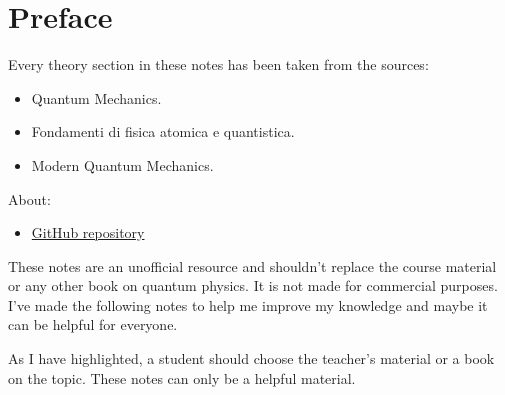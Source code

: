 \section*{Preface}

Every theory section in these notes has been taken from the sources:
\begin{itemize}
    \item Quantum Mechanics.\cite{berera2021quantum}
    \item Fondamenti di fisica atomica e quantistica.\cite{ciccacci2020fondamenti}
    \item Modern Quantum Mechanics.\cite{sakurai2020modern}
\end{itemize}
About:
\begin{itemize}
    \item[\faIcon{github}] \href{https://github.com/PoliMI-HPC-E-notes-projects-AndreVale69/HPC-E-PoliMI-university-notes}{GitHub repository}
\end{itemize}
These notes are an unofficial resource and shouldn't replace the course material or any other book on quantum physics. It is not made for commercial purposes. I've made the following notes to help me improve my knowledge and maybe it can be helpful for everyone.

As I have highlighted, a student should choose the teacher's material or a book on the topic. These notes can only be a helpful material.